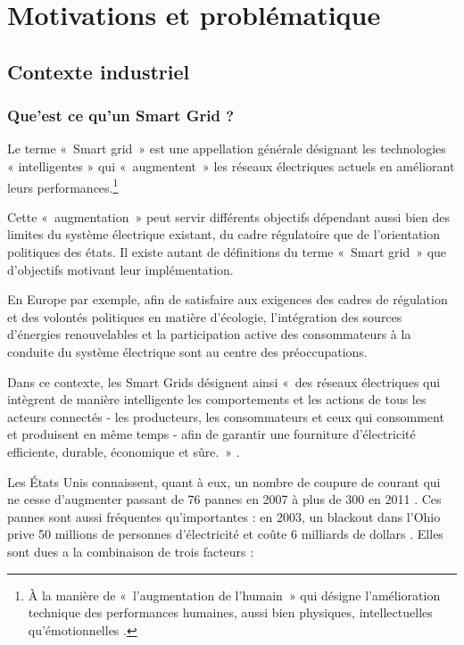 \chapter{Motivations et problématique}
\label{chap:problematique}

\section{Contexte industriel}

\subsection{Que'est ce qu'un Smart Grid ?}
Le terme «~Smart grid~» est une appellation générale désignant les technologies 
« intelligentes » qui «~augmentent~» les réseaux électriques actuels en 
améliorant leurs performances.\footnote{À la manière de «~l'augmentation de 
l'humain~» qui désigne l'amélioration technique des performances humaines, aussi 
bien physiques, intellectuelles qu'émotionnelles \cite{le2013humain}.}

Cette «~augmentation~» peut servir différents objectifs dépendant aussi bien des 
limites du système électrique existant, du cadre régulatoire que de 
l'orientation politiques des états. Il existe autant de définitions du terme 
«~Smart grid~» que d'objectifs motivant leur implémentation.

En Europe par exemple, afin de satisfaire aux exigences des cadres de 
régulation et des volontés politiques en matière d'écologie, l'intégration des 
sources d’énergies renouvelables et la participation active des consommateurs 
à la conduite du système électrique sont au centre des préoccupations.

Dans ce contexte, les Smart Grids désignent ainsi «~des réseaux électriques qui 
intègrent de manière intelligente les comportements et les actions de tous les 
acteurs connectés - les producteurs, les consommateurs et ceux qui consomment 
et produisent en même temps - afin de garantir une fourniture d'électricité 
efficiente, durable, économique et sûre.~» \cite{ETP}.

Les États Unis connaissent, quant à eux, un nombre de coupure de courant qui ne 
cesse d'augmenter passant de 76 pannes en 2007 à plus de 300 en 2011 
\cite{detroit}. Ces pannes sont aussi fréquentes qu'importantes : en 2003, un 
blackout dans l'Ohio prive 50 millions de personnes d'électricité et coûte 6 
milliards de dollars \cite{andersson2005causes}. Elles sont dues a la 
combinaison de trois facteurs \cite{outages}:

